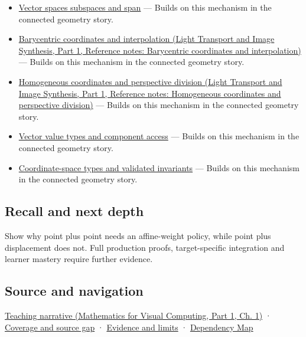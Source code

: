 \hypertarget{appendix-0659864c0aa3-used-by}{}

\begin{itemize}
\tightlist
\item
  \hyperref[appendix-173b52c063ae]{Vector spaces subspaces and span} --- Builds on this mechanism in the connected geometry story.
\item
  \href{../04-Light-Transport-and-Image-Synthesis-P01/main.pdf\#nameddest=appendix-02b9d9a81dca}{Barycentric coordinates and interpolation (Light Transport and Image Synthesis, Part 1, Reference notes: Barycentric coordinates and interpolation)} --- Builds on this mechanism in the connected geometry story.
\item
  \href{../04-Light-Transport-and-Image-Synthesis-P01/main.pdf\#nameddest=appendix-cb3b26862282}{Homogeneous coordinates and perspective division (Light Transport and Image Synthesis, Part 1, Reference notes: Homogeneous coordinates and perspective division)} --- Builds on this mechanism in the connected geometry story.
\item
  \hyperref[appendix-37a39984ba66]{Vector value types and component access} --- Builds on this mechanism in the connected geometry story.
\item
  \hyperref[appendix-380a220e2529]{Coordinate-space types and validated invariants} --- Builds on this mechanism in the connected geometry story.
\end{itemize}

\subsection{Recall and next depth}\label{appendix-0659864c0aa3-recall-and-next-depth}

\hypertarget{appendix-0659864c0aa3-recall-and-next-depth}{}

Show why point plus point needs an affine-weight policy, while point plus displacement does not. Full production proofs, target-specific integration and learner mastery require further evidence.

\subsection{Source and navigation}\label{appendix-0659864c0aa3-source-and-navigation}

\hypertarget{appendix-0659864c0aa3-source-and-navigation}{}

\href{../02-Mathematics-for-Visual-Computing-P01/main.pdf\#nameddest=01-foundations-i-ch017-an-arrow-is-not-the-address-written-beside-it}{Teaching narrative (Mathematics for Visual Computing, Part 1, Ch. 1)} · \hyperref[appendix-fd090d982a15-phase-6---parts-501-600]{Coverage and source gap} · \hyperref[appendix-a103e7846d21-phase-6---source-analysis-and-verification]{Evidence and limits} · \hyperref[appendix-4ad47bdd269a]{Dependency Map}
